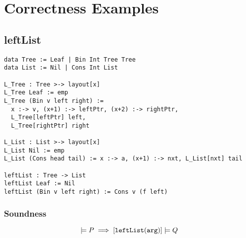 \documentclass[10pt]{article}
\begin{document}
\section{Correctness Examples}

\subsection{leftList}

\begin{lstlisting}
data Tree := Leaf | Bin Int Tree Tree
data List := Nil | Cons Int List

L_Tree : Tree >-> layout[x]
L_Tree Leaf := emp
L_Tree (Bin v left right) :=
  x :-> v, (x+1) :-> leftPtr, (x+2) :-> rightPtr,
  L_Tree[leftPtr] left,
  L_Tree[rightPtr] right

L_List : List >-> layout[x]
L_List Nil := emp
L_List (Cons head tail) := x :-> a, (x+1) :-> nxt, L_List[nxt] tail

leftList : Tree -> List
leftList Leaf := Nil
leftList (Bin v left right) := Cons v (f left)
\end{lstlisting}

\subsubsection{Soundness}

\begin{equation*}
  [\ttt{arg}] \models P \implies [\ttt{leftList}(\ttt{arg})] \models Q
\end{equation*}
\end{document}
